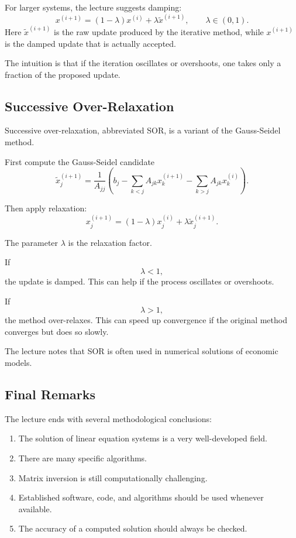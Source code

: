 \documentclass[10pt, letterpaper]{article}
\begin{document}
For larger systems, the lecture suggests damping:
\[
x^{(i+1)}
=
(1-\lambda)x^{(i)}
+
\lambda \widetilde{x}^{(i+1)},
\qquad
\lambda\in(0,1).
\]
Here \(\widetilde{x}^{(i+1)}\) is the raw update produced by the iterative method, while \(x^{(i+1)}\) is the damped update that is actually accepted.

The intuition is that if the iteration oscillates or overshoots, one takes only a fraction of the proposed update.

\subsection{Successive Over-Relaxation}

Successive over-relaxation, abbreviated SOR, is a variant of the Gauss-Seidel method.

First compute the Gauss-Seidel candidate
\[
\widetilde{x}_j^{(i+1)}
=
\frac{1}{A_{jj}}
\left(
b_j
-
\sum_{k<j}A_{jk}x_k^{(i+1)}
-
\sum_{k>j}A_{jk}x_k^{(i)}
\right).
\]

Then apply relaxation:
\[
x_j^{(i+1)}
=
(1-\lambda)x_j^{(i)}
+
\lambda \widetilde{x}_j^{(i+1)}.
\]

The parameter \(\lambda\) is the relaxation factor.

If
\[
\lambda<1,
\]
the update is damped. This can help if the process oscillates or overshoots.

If
\[
\lambda>1,
\]
the method over-relaxes. This can speed up convergence if the original method converges but does so slowly.

The lecture notes that SOR is often used in numerical solutions of economic models.

\subsection{Final Remarks}

The lecture ends with several methodological conclusions:
\begin{enumerate}
    \item The solution of linear equation systems is a very well-developed field.
    \item There are many specific algorithms.
    \item Matrix inversion is still computationally challenging.
    \item Established software, code, and algorithms should be used whenever available.
    \item The accuracy of a computed solution should always be checked.
\end{enumerate}
\end{document}
